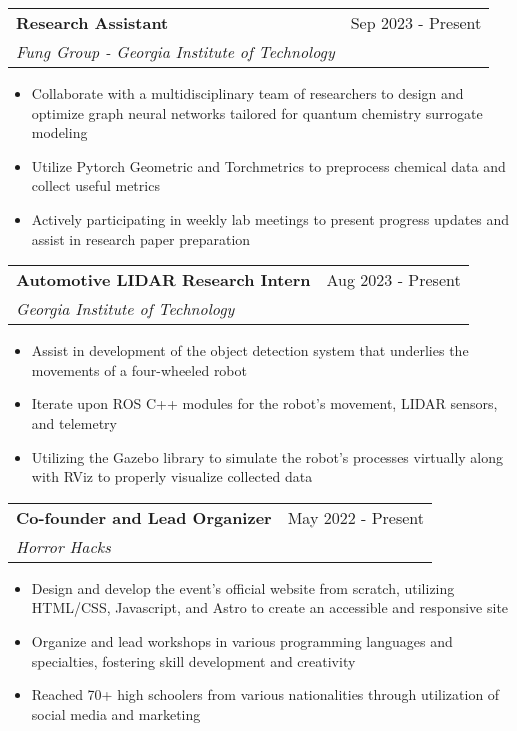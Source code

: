 \documentclass[letterpaper,11pt]{article}
\makeatletter
\newcommand{\resumeItem}[1]{
  \item\small{
    {#1 \vspace{-2pt}}
  }
}
\newcommand{\resumeSubheading}[4]{%
\vspace{-1pt}%
  \item
    \begin{tabular*}{0.97\textwidth}{l@{\extracolsep{\fill}}r}
      \textbf{#1} & #2 \\
      \textit{\small#3} & \textit{\small #4} \\

    \end{tabular*}%
  \vspace{-9pt}
}
\newcommand{\resumeItemListStart}{\begin{itemize}}
\newcommand{\resumeItemListEnd}{\end{itemize}\vspace{-5pt}}
\makeatother
\begin{document}
      \resumeSubheading
        {Research Assistant}{Sep 2023 - Present}
        {Fung Group - Georgia Institute of Technology}{}
        \resumeItemListStart
          \resumeItem{Collaborate with a multidisciplinary team of researchers to design and optimize graph neural networks tailored for quantum chemistry surrogate modeling}
          \resumeItem{Utilize Pytorch Geometric and Torchmetrics to preprocess chemical data and collect useful metrics}
          \resumeItem{Actively participating in weekly lab meetings to present progress updates and assist in research paper preparation}
        \resumeItemListEnd


      \resumeSubheading
        {Automotive LIDAR Research Intern}{Aug 2023 - Present}
        {Georgia Institute of Technology}{}
        \resumeItemListStart
          \resumeItem{Assist in development of the object detection system that underlies the movements of a four-wheeled robot}
          \resumeItem{Iterate upon ROS C++ modules for the robot's movement, LIDAR sensors, and telemetry}
          \resumeItem{Utilizing the Gazebo library to simulate the robot's processes virtually along with RViz to properly visualize collected data}
        \resumeItemListEnd

      \resumeSubheading
        {Co-founder and Lead Organizer}{May 2022 - Present}
        {Horror Hacks}{}
        \resumeItemListStart
          \resumeItem{Design and develop the event's official website from scratch, utilizing HTML/CSS, Javascript, and Astro to create an accessible and responsive site}
          \resumeItem{Organize and lead workshops in various programming languages and specialties, fostering skill development and creativity}
          \resumeItem{Reached 70+ high schoolers from various nationalities through utilization of social media and marketing}
        \resumeItemListEnd

\end{document}
